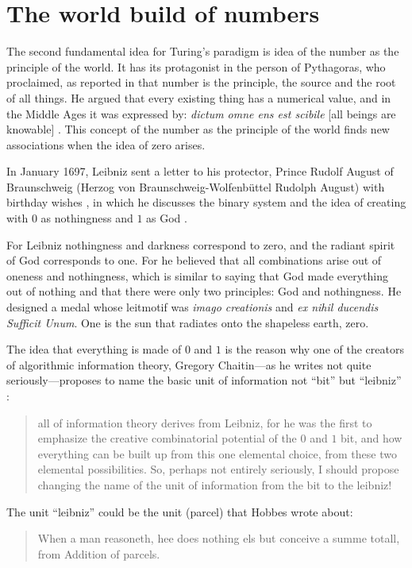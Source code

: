 \documentclass[pdftex,12pt]{article}
\begin{document}
\section{The world build of numbers} 
The second fundamental idea for Turing's paradigm is idea of the number as the principle of the world. It has its protagonist in the person of Pythagoras, who proclaimed, as reported in \parencite[p.21]{Guthrie1987} that number is the principle, the source and the root of all things. He argued that every existing thing has a numerical value, and in the Middle Ages it was expressed by: \emph{dictum omne ens est scibile} [all beings are knowable]%
\parencites[pp.135--136]{Cherry2017}[see also][]{heschmeyer_two_2012}.
This concept of the number as the principle of the world finds new associations when the idea of zero arises.

In January 1697, Leibniz sent a letter to his protector, Prince Rudolf August of Braunschweig (Herzog von Braunschweig-Wolfenbüttel Rudolph August) with birthday wishes \parencite{list1697}, in which he discusses the binary system and the idea of creating with $0$ as nothingness and $1$ as God \parencite{Swetz2003}.

For Leibniz \parencite*{list1697} nothingness and darkness correspond to zero, and the radiant spirit of God corresponds to one. For he believed that all combinations arise out of oneness and nothingness, which is similar to saying that God made everything out of nothing and that there were only two principles: God and nothingness. He designed a medal whose leitmotif was \emph{imago creationis} and \emph{ex nihil ducendis Sufficit Unum}. One is the sun that radiates onto the shapeless earth, zero.

The idea that everything is made of $0$ and $1$ is the reason why one of the creators of algorithmic information theory, Gregory Chaitin---as he writes not quite seriously---proposes to name the basic unit of information not ``bit'' but ``leibniz'' \parencites{Chaitin2004}[cf.][]{Trzesicki2006a}: \begin{quote} \small all of information theory derives from Leibniz, for he was the first to emphasize the creative combinatorial potential of the $0$ and $1$ bit, and how everything can be built up from this one elemental choice, from these two elemental possibilities. So, perhaps not entirely seriously, I should propose changing the name of the unit of information from the bit to the leibniz! \end{quote} The unit ``leibniz'' could be the unit (parcel) that Hobbes \parencite*[Chapter V. Of Reason, and Science]{Hobbes1651} wrote about: \begin{quote} \small When a man reasoneth, hee does nothing els but conceive a summe totall, from Addition of parcels. \end{quote}
\end{document}
